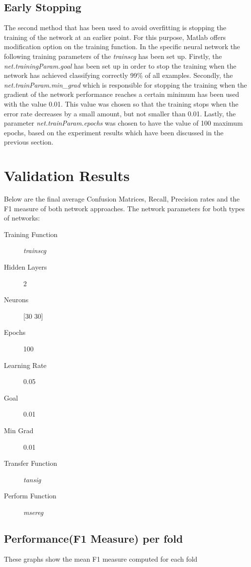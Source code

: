 \documentclass[a4paper,11pt]{article}
\begin{document}
\subsection{Early Stopping}
The second method that has been used to avoid overfitting is stopping the training of the network at an earlier point. For this purpose, Matlab offers modification option on the training function. In the specific neural network the following training parameters of the \emph{trainscg} has been set up. Firstly, the \emph{net.trainingParam.goal} has been set up in order to stop the training when the network has achieved classifying correctly 99\% of all examples. Secondly, the \emph{net.trainParam.min\_grad} which is responsible for stopping the training when the gradient of the network performance reaches a certain minimum has been used with the value 0.01. This value was chosen so that the training stops when the error rate decreases by a small amount, but not smaller than 0.01.  Lastly, the parameter \emph{net.trainParam.epochs} was chosen to have the value of 100 maximum epochs, based on the experiment results which have been discussed in the previous section.

\section{Validation Results}
Below are the final average Confusion Matrices, Recall, Precision rates and the F1 measure of both network approaches. The network parameters for both types of networks:

\begin{description}
  \item[Training Function] \emph{trainscg}
  \item[Hidden Layers] 2
  \item[Neurons] [30 30]
  \item[Epochs] 100
  \item[Learning Rate] 0.05
  \item[Goal] 0.01
  \item[Min Grad] 0.01
  \item[Transfer Function] \emph{tansig}
  \item[Perform Function] \emph{msereg}
\end{description}


\subsection{Performance(F1 Measure) per fold}
These graphs show the mean F1 measure computed for each fold
\end{document}
